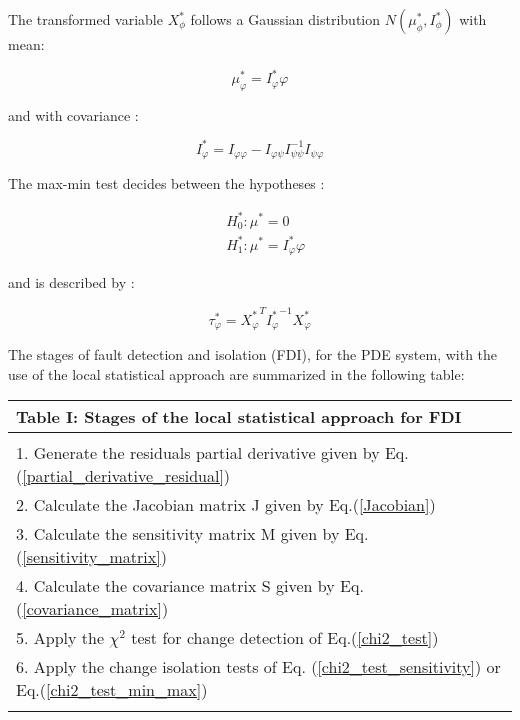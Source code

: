 \documentclass[journal]{IEEEtran}
\begin{document}
\noindent The transformed variable $X_{\phi}^{*}$ follows a Gaussian distribution $N(\mu_{\phi}^{*},I_{\phi}^{*})$
with mean:

\begin{equation}
{\mu_{\varphi}^{*}}={I_{\varphi}^{*}}\varphi
\end{equation}

\noindent
and with covariance :

\begin{equation}
{I_{\varphi}^{*}}=I_{\varphi\varphi}-I_{\varphi\psi}{I_{\psi\psi}^{-1}}I_{\psi\varphi}
\end{equation}

\noindent
The max-min test decides between the hypotheses :

\begin{eqnarray*}
& H_0^{*} : \mu^{*}=0 \\
& H_1^{*} : \mu^{*}=I_{\varphi}^{*}{\varphi}
\end{eqnarray*}

\noindent
and is described by :

\begin{equation} \label{chi2_test_min_max}
\tau_{\varphi}^{*}={{X_{\varphi}^{*}}^T}{{I_{\varphi}^{*}}^{-1}}{X_{\varphi}^{*}}
\end{equation}

\noindent The stages of fault detection and isolation (FDI), for the PDE system, with the use of the local statistical approach are summarized in the following table:

\begin{center}
\begin{tabular}{|l|}
\hline
\noindent Table I: Stages of the local statistical approach for FDI\\
\hline \\
1. Generate the residuals partial derivative given by Eq.(\ref{partial_derivative_residual}) \\
2. Calculate the Jacobian matrix J given by Eq.(\ref{Jacobian}) \\
3. Calculate the sensitivity matrix M given by Eq.(\ref{sensitivity_matrix}) \\
4. Calculate the covariance matrix S given by Eq.(\ref{covariance_matrix}) \\
5. Apply the $\chi^2$ test for change detection of Eq.(\ref{chi2_test}) \\
6. Apply the change isolation tests of Eq. (\ref{chi2_test_sensitivity}) or Eq.(\ref{chi2_test_min_max}) \\
\\
\hline
\end{tabular}
\end{center}
\end{document}
